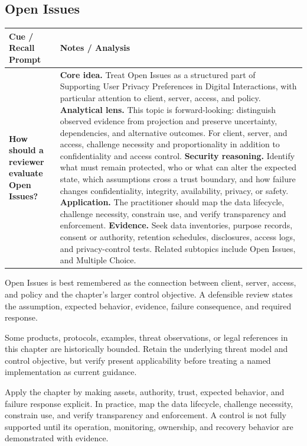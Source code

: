 \documentclass[11pt]{article}
\newcommand{\CornellHeader}{%
\rowcolor{Navy}\color{white}\bfseries Cue / Recall Prompt & \color{white}\bfseries Notes / Analysis\\\hline}
\newcommand{\CornellRow}[2]{%
\cellcolor{CueGray}\RaggedRight\textbf{#1} & \RaggedRight #2\\\hline}
\begin{document}
\subsection*{Open Issues}
\begin{longtable}{>{\RaggedRight\arraybackslash}p{}|>{\RaggedRight\arraybackslash}p{}}
\CornellHeader
\CornellRow{How should a reviewer evaluate Open Issues?}{\textbf{Core idea.} Treat Open Issues as a structured part of Supporting User Privacy Preferences in Digital Interactions, with particular attention to client, server, access, and policy. \textbf{Analytical lens.} This topic is forward-looking: distinguish observed evidence from projection and preserve uncertainty, dependencies, and alternative outcomes. For client, server, and access, challenge necessity and proportionality in addition to confidentiality and access control. \textbf{Security reasoning.} Identify what must remain protected, who or what can alter the expected state, which assumptions cross a trust boundary, and how failure changes confidentiality, integrity, availability, privacy, or safety. \textbf{Application.} The practitioner should map the data lifecycle, challenge necessity, constrain use, and verify transparency and enforcement. \textbf{Evidence.} Seek data inventories, purpose records, consent or authority, retention schedules, disclosures, access logs, and privacy-control tests. Related subtopics include Open Issues, and Multiple Choice.}
\end{longtable}
\begin{topicsummary}
Open Issues is best remembered as the connection between client, server, access, and policy and the chapter's larger control objective. A defensible review states the assumption, expected behavior, evidence, failure consequence, and required response.
\end{topicsummary}
\begin{historybox}
Some products, protocols, examples, threat observations, or legal references in this chapter are historically bounded. Retain the underlying threat model and control objective, but verify present applicability before treating a named implementation as current guidance.
\end{historybox}
\begin{defensebox}
Apply the chapter by making assets, authority, trust, expected behavior, and failure response explicit. In practice, map the data lifecycle, challenge necessity, constrain use, and verify transparency and enforcement. A control is not fully supported until its operation, monitoring, ownership, and recovery behavior are demonstrated with evidence.
\end{defensebox}
\end{document}
